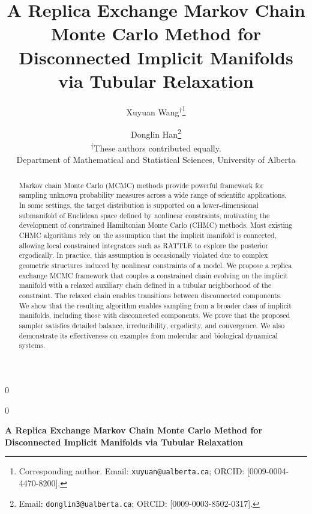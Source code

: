 \documentclass[12pt]{article}
\newcommand{\blind}{0}
\begin{document}
%

\def\spacingset#1{\renewcommand{\baselinestretch}%
{#1}\small\normalsize} \spacingset{1}



\date{} %
\blind
{
  \title{\bf A Replica Exchange Markov Chain Monte Carlo Method for Disconnected Implicit Manifolds via Tubular Relaxation}
  \author{
    Xuyuan Wang$^{\dagger}$\thanks{Corresponding author. Email: \texttt{xuyuan@ualberta.ca}; ORCID: [0009-0004-4470-8200].}
    \and
    Donglin Han\thanks{Email: \texttt{donglin3@ualberta.ca}; ORCID: [0009-0003-8502-0317].}
    \\ \medskip
    \textsuperscript{$\dagger$}These authors contributed equally.
    \\ \medskip
    Department of Mathematical and Statistical Sciences, University of Alberta
  }
  \maketitle
} \fi

\blind
{
  \bigskip
  \bigskip
  \bigskip
  \begin{center}
    {\LARGE\bf A Replica Exchange Markov Chain Monte Carlo Method for Disconnected Implicit Manifolds via Tubular Relaxation}
  \end{center}
  \medskip
} \fi

\begin{abstract}
Markov chain Monte Carlo (MCMC) methods provide powerful framework for sampling unknown probability measures across a wide range of scientific applications. In some settings, the target distribution is supported on a lower-dimensional submanifold of Euclidean space defined by nonlinear constraints, motivating the development of constrained Hamiltonian Monte Carlo (CHMC) methods. Most existing CHMC algorithms rely on the assumption that the implicit manifold is connected, allowing local constrained integrators such as RATTLE to explore the posterior ergodically. In practice, this assumption is occasionally violated due to complex geometric structures induced by nonlinear constraints of a model.
We propose a replica exchange MCMC framework that couples a constrained chain evolving on the implicit manifold with a relaxed auxiliary chain defined in a tubular neighborhood of the constraint. The relaxed chain enables transitions between disconnected components. We show that the resulting algorithm enables sampling from a broader class of implicit manifolds, including those with disconnected components. We prove that the proposed sampler satisfies detailed balance, irreducibility, ergodicity, and convergence.
We also demonstrate its effectiveness on examples from molecular and biological dynamical systems.

\end{abstract}
\end{document}
